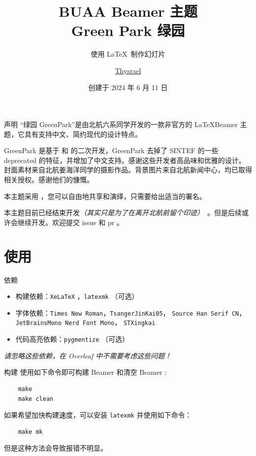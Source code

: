 \documentclass{ctexbeamer}
\title{BUAA Beamer 主题 \\ Green Park 绿园}
\subtitle{使用 \LaTeX\ 制作幻灯片}
\author{\href{https://github.com/Thysrael}{Thysrael}}
\date{创建于 2024 年 6 月 11 日}
\begin{document}
\maketitle

\begin{frame}{声明}
  “绿园 GreenPark”是由北航六系同学开发的一款非官方的 \LaTeX Beamer 主题，它具有支持中文、简约现代的设计特点。
  
  GreenPark 是基于  和  的二次开发，GreenPark 去掉了 SINTEF 的一些 deprecated 的特征，并增加了中文支持。感谢这些开发者高品味和优雅的设计。封面素材来自北航姜海洋同学的摄影作品。背景图片来自北航新闻中心，均已取得相关授权。感谢他们的慷慨。

  本主题采用 ，您可以自由地共享和演绎，只需要给出适当的署名。

  本主题目前已经结束开发\textsl{（其实只是为了在离开北航前留个印迹）}\   。但是后续或许会继续开发。欢迎提交 issue 和 pr 。

\end{frame}

\section{使用}
\begin{frame}{依赖}
  \begin{itemize}
  \item 构建依赖：\texttt{XeLaTeX} ，\texttt{latexmk} （可选）
  \item 字体依赖：\texttt{Times New Roman}，\texttt{TsangerJinKai05}， \texttt{Source Han Serif CN}，\texttt{JetBrainsMono Nerd Font Mono}， \texttt{STXingkai}
  \item 代码高亮依赖：\texttt{pygmentize} （可选）
  \end{itemize}
  
  \emph{请忽略这些依赖，在 Overleaf 中不需要考虑这些问题！}
\end{frame}

\begin{frame}[fragile]{构建}
  使用如下命令即可构建 Beamer 和清空 Beamer :
  
  \begin{verbatim}
    make
    make clean
  \end{verbatim}

  如果希望加快构建速度，可以安装 \texttt{latexmk} 并使用如下命令：

  \begin{verbatim}
    make mk
  \end{verbatim}

  但是这种方法会导致报错不明显。
\end{frame}
\end{document}
